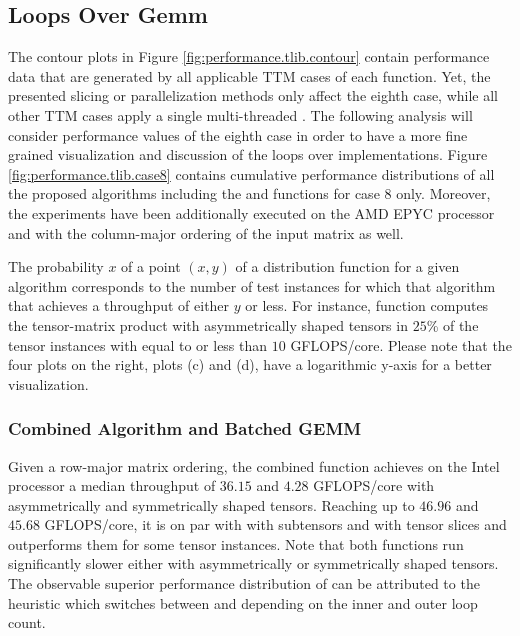 
\subsection{Loops Over Gemm}
The contour plots in Figure \ref{fig:performance.tlib.contour} contain performance data that are generated by all applicable TTM cases of each  function.
Yet, the presented slicing or parallelization methods only affect the eighth case, while all other TTM cases apply a single multi-threaded .
The following analysis will consider performance values of the eighth case in order to have a more fine grained visualization and discussion of the loops over  implementations.
Figure \ref{fig:performance.tlib.case8} contains cumulative performance distributions of all the proposed algorithms including the   and  functions for case 8 only.
Moreover, the experiments have been additionally executed on the AMD EPYC processor and with the column-major ordering of the input matrix as well.

The probability $x$ of a point $(x,y)$ of a distribution function for a given algorithm corresponds to the number of test instances for which that algorithm that achieves a throughput of either $y$ or less.
For instance, function  computes the tensor-matrix product with asymmetrically shaped tensors in $25$\% of the tensor instances with equal to or less than $10$ GFLOPS/core.
Please note that the four plots on the right, plots (c) and (d), have a logarithmic y-axis for a better visualization.


\subsubsection{Combined Algorithm and Batched GEMM}
Given a row-major matrix ordering, the combined function  achieves on the Intel processor a median throughput of $36.15$ and $4.28$ GFLOPS/core with asymmetrically and symmetrically shaped tensors.
Reaching up to $46.96$ and $45.68$ GFLOPS/core, it is on par with  with subtensors and  with tensor slices and outperforms them for some tensor instances.
Note that both functions run significantly slower either with asymmetrically or symmetrically shaped tensors.
The observable superior performance distribution of  can be attributed to the heuristic which switches between  and  depending on the inner and outer loop count.

